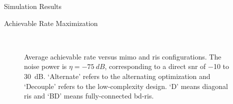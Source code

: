 \documentclass[journal]{IEEEtran}
\begin{document}
\begin{section}{Simulation Results}
\begin{subsection}{Achievable Rate Maximization}
		\begin{figure}[!t]
			\centering
			\\
			\caption{
				Average achievable rate versus \gls{mimo} and \gls{ris} configurations.
				The noise power is $\eta = \qty{-75}{dB}$, corresponding to a direct \gls{snr} of \num{-10} to \qty{30}{dB}.
				`Alternate' refers to the alternating optimization and `Decouple' refers to the low-complexity design.
				`D' means diagonal \gls{ris} and `BD' means fully-connected \gls{bd}-\gls{ris}.
			}
			\label{fg:rate}
		\end{figure}


\end{subsection}
\end{section}
\end{document}

